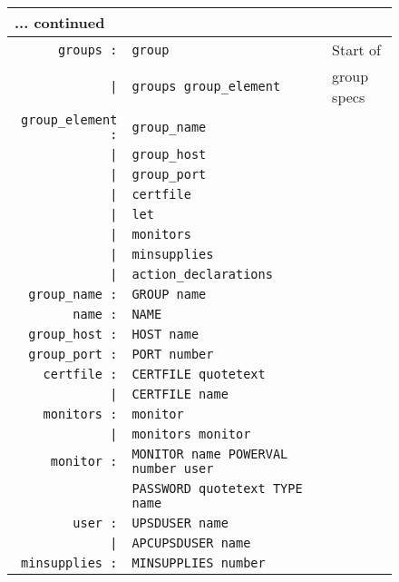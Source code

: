 \documentclass[12pt]{article}
\begin{document}
\begin{figure}[ht]
\begin{center}
\begin{tabular}{|rp{0.65\LinePrinterwidth}|p{0.15\LinePrinterwidth}|}
\hline
\multicolumn{3}{|l|}{\small ... continued} \\ \hline\hline
\texttt{groups :}          & \texttt{group} & Start of \\
       \texttt{|}          & \texttt{groups group\_element} & group specs \\ \hline
\texttt{group\_element :}  & \texttt{group\_name} & \\
               \texttt{|}  & \texttt{group\_host} & \\
               \texttt{|}  & \texttt{group\_port} & \\
               \texttt{|}  & \texttt{certfile} & \\
               \texttt{|}  & \texttt{let} & \\
               \texttt{|}  & \texttt{monitors} & \\
               \texttt{|}  & \texttt{minsupplies} & \\
               \texttt{|}  & \texttt{action\_declarations} & \\ \hline
\texttt{group\_name :}     & \texttt{GROUP name} & \\ \hline
\texttt{name :}            & \texttt{NAME} & \\ \hline
\texttt{group\_host :}     & \texttt{HOST name} & \\ \hline
\texttt{group\_port :}     & \texttt{PORT number} & \\ \hline
\texttt{certfile :}        & \texttt{CERTFILE quotetext} & \\
         \texttt{|}        & \texttt{CERTFILE name} & \\ \hline
\texttt{monitors :}        & \texttt{monitor} & \\
         \texttt{|}        & \texttt{monitors monitor} & \\ \hline
\texttt{monitor :}         & \texttt{MONITOR name POWERVAL number user} & \\
                           & \texttt{PASSWORD quotetext TYPE name} & \\ \hline
\texttt{user :}            & \texttt{UPSDUSER name} & \\
     \texttt{|}            & \texttt{APCUPSDUSER name} & \\ \hline
\texttt{minsupplies :}     & \texttt{MINSUPPLIES number} & \\ \hline

\end{tabular}
\end{center}
\end{figure}
\end{document}
